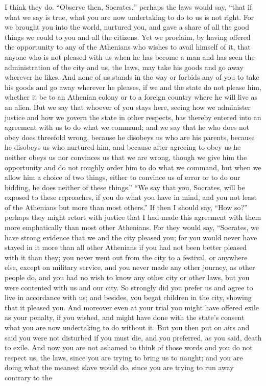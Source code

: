 \documentclass[letterpaper,12pt]{article}
\begin{document}
\begin{drama}
\critospeaks 
I think they do.
\socratesspeaks 
``Observe then, Socrates,'' perhaps the laws would say, ``that if what we say is true, what you are now undertaking to do to us is not right. For we brought you into the world, nurtured you, and gave a share of all the good things  we could to you and all the citizens. Yet we proclaim, by having offered the opportunity to any of the Athenians who wishes to avail himself of it, that anyone who is not pleased with us when he has become a man and has seen the administration of the city and us, the laws, may take his goods and go away wherever he likes. And none of us stands in the way or forbids any of you to take his goods and go away wherever he pleases, if we and the state do not please him, whether it be to an Athenian colony or to a foreign country where he will live as an alien. But we say that  whoever of you stays here, seeing how we administer justice and how we govern the state in other respects, has thereby entered into an agreement with us to do what we command; and we say that he who does not obey does threefold wrong, because he disobeys us who are his parents, because he disobeys us who nurtured him, and because after agreeing to obey us he neither obeys us nor convinces us that  we are wrong, though we give him the opportunity and do not roughly order him to do what we command, but when we allow him a choice of two things, either to convince us of error or to do our bidding, he does neither of these things.'' ``We say that you, Socrates, will be exposed to these reproaches, if you do what you have in mind, and you not least of the Athenians but more than most others.'' If then I should say, ``How so?'' perhaps they might retort with justice that I had made this agreement with them more emphatically than most other Athenians. For they would say,  ``Socrates, we have strong evidence that we and the city pleased you; for you would never have stayed in it more than all other Athenians if you had not been better pleased with it than they; you never went out from the city to a festival, or anywhere else, except on military service, and you never made any other journey, as other people do, and you had no wish to know any other city or other laws, but you were contented with us and our city. So strongly did you prefer us  and agree to live in accordance with us; and besides, you begat children in the city, showing that it pleased you. And moreover even at your trial you might have offered exile as your penalty, if you wished, and might have done with the state's consent what you are now undertaking to do without it. But you then put on airs and said you were not disturbed if you must die, and you preferred, as you said, death to exile. And now you are not ashamed to think of those words and you do not respect us, the laws, since you are trying to bring us to naught;  and you are doing what the meanest slave would do, since you are trying to run away contrary to the 
\end{drama}
\end{document}
